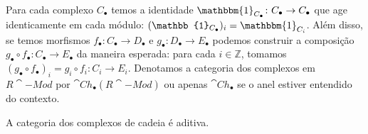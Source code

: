 Para cada complexo $C_\bullet$ temos a identidade $\mathbbm{1}_{C_\bullet} \colon C_\bullet \to C_\bullet$ que age identicamente em cada módulo: $(\mathbb{1}_{C_\bullet})_i = \mathbbm{1}_{C_i}$. Além disso, se temos morfismos $f_\bullet \colon C_\bullet \to D_\bullet$ e $g_\bullet \colon D_\bullet \to E_\bullet$ podemos construir a composição $g_\bullet \circ f_\bullet \colon C_\bullet \to E_\bullet$ da maneira esperada: para cada $i \in \mathbb{Z}$, tomamos $(g_\bullet \circ f_\bullet)_i = g_i \circ f_i \colon C_i \to E_i$. Denotamos a categoria dos complexos em $R\cat{-Mod}$ por $\cat{Ch}_\bullet(R\cat{-Mod})$ ou apenas $\cat{Ch}_\bullet$ se o anel estiver entendido do contexto.

\begin{prop}
    A categoria dos complexos de cadeia é aditiva.
\end{prop}
\begin{demo}

\end{demo}